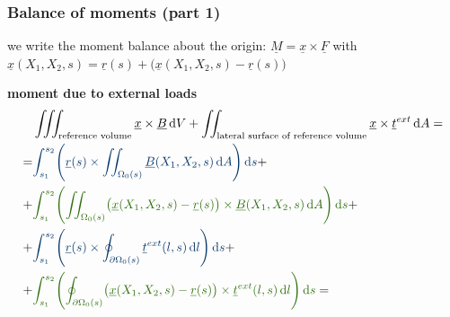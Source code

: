 \begin{frame}
  \frametitle{Balance of moments (part 1)}
  
  we write the moment balance about the origin: $\underline{M} = \underline{x} \times \underline{F}$ \newline
  with $\underline{x}(X_1,X_2,s) = \underline{r}(s) + \bigl( \underline{x}(X_1,X_2,s) - \underline{r}(s) \bigr)$
  \vspace{0.5em}
  
  \textbf{moment due to external loads}
  \begin{displaymath}
    \begin{alignedat}{1}
      &\iiint_{\text{reference volume}} \underline{x} \times \underline{B} \dif V +
      \iint_{\text{lateral surface of reference volume}} \underline{x} \times \underline{t}^{ext} \dif A = \\ 
      = &{\color{faublue} \int_{s_1}^{s_2} \Biggl( \underline{r}(s) \times \iint_{\Omega_{0}(s)} \underline{B}(X_1,X_2,s) \dif A \Biggr) \dif s } + \\
      + &{\color{og_dark_green} \int_{s_1}^{s_2} \Biggl( \iint_{\Omega_{0}(s)} \bigl( \underline{x}(X_1,X_2,s) - \underline{r}(s) \bigr) \times \underline{B}(X_1,X_2,s) \dif A \Biggr) \dif s } + \\
      + &{\color{faublue} \int_{s_1}^{s_2} \Biggl( \underline{r}(s) \times \oint_{\partial \Omega_{0}(s)} \underline{t}^{ext}(l,s) \dif l \Biggr) \dif s } + \\
      + &{\color{og_dark_green} \int_{s_1}^{s_2} \Biggl( \oint_{\partial \Omega_{0}(s)} \bigl( \underline{x}(X_1,X_2,s) - \underline{r}(s) \bigr) \times \underline{t}^{ext}(l,s) \dif l \Biggr) \dif s } =
    \end{alignedat}
  \end{displaymath}
\end{frame}



